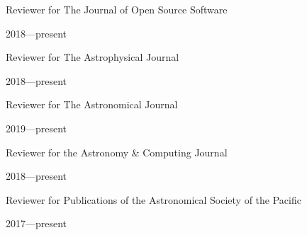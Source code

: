 \documentclass[12pt, a4paper]{article} %
\begin{document}
\vspace{0.2cm}

\begin{minipage}[t]{0.7\textwidth}
\begin{flushleft}%
  \setlength{\leftskip}{0.2cm}%
Reviewer for The Journal of Open Source Software
\end{flushleft}
\end{minipage}
\begin{minipage}[t]{0.3\textwidth}
\hfill 2018---present
\end{minipage}

\vspace{0.2cm}

\begin{minipage}[t]{0.7\textwidth}
\begin{flushleft}%
  \setlength{\leftskip}{0.2cm}%
Reviewer for The Astrophysical Journal
\end{flushleft}
\end{minipage}
\begin{minipage}[t]{0.3\textwidth}
\hfill 2018---present
\end{minipage}

\vspace{0.2cm}

\begin{minipage}[t]{0.7\textwidth}
\begin{flushleft}%
  \setlength{\leftskip}{0.2cm}%
Reviewer for The Astronomical Journal
\end{flushleft}
\end{minipage}
\begin{minipage}[t]{0.3\textwidth}
\hfill 2019---present
\end{minipage}

\vspace{0.2cm}

\begin{minipage}[t]{0.7\textwidth}
\begin{flushleft}%
  \setlength{\leftskip}{0.2cm}%
Reviewer for the Astronomy \& Computing Journal
\end{flushleft}
\end{minipage}
\begin{minipage}[t]{0.3\textwidth}
\hfill 2018---present
\end{minipage}

\vspace{0.2cm}

\begin{minipage}[t]{0.7\textwidth}
\begin{flushleft}%
  \setlength{\leftskip}{0.2cm}%
Reviewer for Publications of the Astronomical Society of the Pacific 
\end{flushleft}
\end{minipage}
\begin{minipage}[t]{0.3\textwidth}
\hfill 2017---present
\end{minipage}
\end{document}
